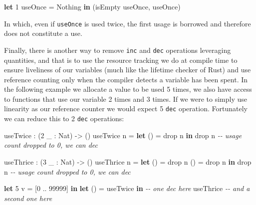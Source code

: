 \documentclass[
]{article}
\newenvironment{Shaded}{}{}
\newcommand{\CommentTok}[1]{\textcolor[rgb]{0.38,0.63,0.69}{\textit{#1}}}
\newcommand{\DataTypeTok}[1]{\textcolor[rgb]{0.56,0.13,0.00}{#1}}
\newcommand{\DecValTok}[1]{\textcolor[rgb]{0.25,0.63,0.44}{#1}}
\newcommand{\FunctionTok}[1]{\textcolor[rgb]{0.02,0.16,0.49}{#1}}
\newcommand{\KeywordTok}[1]{\textcolor[rgb]{0.00,0.44,0.13}{\textbf{#1}}}
\newcommand{\NormalTok}[1]{#1}
\newcommand{\OperatorTok}[1]{\textcolor[rgb]{0.40,0.40,0.40}{#1}}
\newcommand{\OtherTok}[1]{\textcolor[rgb]{0.00,0.44,0.13}{#1}}
\begin{document}
\begin{Shaded}
\begin{Highlighting}[]
\KeywordTok{let} \DecValTok{1}\NormalTok{ useOnce }\OtherTok{=} \DataTypeTok{Nothing} \KeywordTok{in}
\NormalTok{    (isEmpty useOnce, useOnce)}
\end{Highlighting}
\end{Shaded}

In which, even if \texttt{useOnce} is used twice, the first usage is
borrowed and therefore does not constitute a use.

Finally, there is another way to remove \texttt{inc} and \texttt{dec}
operations leveraging quantities, and that is to use the resource
tracking we do at compile time to ensure liveliness of our variables
(much like the lifetime checker of Rust) and use reference counting only
when the compiler detects a variable has been spent. In the following
example we allocate a value to be used 5 times, we also have access to
functions that use our variable 2 times and 3 times. If we were to
simply use linearity as our reference counter we would expect 5
\texttt{dec} operation. Fortunately we can reduce this to 2 \texttt{dec}
operations:

\begin{Shaded}
\begin{Highlighting}[]
\NormalTok{useTwice }\OperatorTok{:}\NormalTok{ (}\DecValTok{2}\NormalTok{ \_ }\OperatorTok{:} \DataTypeTok{Nat}\NormalTok{) }\OtherTok{{-}\textgreater{}}\NormalTok{ ()}
\NormalTok{useTwice n }\OtherTok{=} \KeywordTok{let}\NormalTok{ () }\OtherTok{=} \FunctionTok{drop}\NormalTok{ n }\KeywordTok{in}
                 \FunctionTok{drop}\NormalTok{ n }\CommentTok{{-}{-} usage count dropped to 0, we can \textasciigrave{}dec\textasciigrave{}}

\NormalTok{useThrice }\OperatorTok{:}\NormalTok{ (}\DecValTok{3}\NormalTok{ \_ }\OperatorTok{:} \DataTypeTok{Nat}\NormalTok{) }\OtherTok{{-}\textgreater{}}\NormalTok{ ()}
\NormalTok{useThrice n }\OtherTok{=} \KeywordTok{let}\NormalTok{ () }\OtherTok{=} \FunctionTok{drop}\NormalTok{ n }
\NormalTok{                  () }\OtherTok{=} \FunctionTok{drop}\NormalTok{ n}
               \KeywordTok{in} \FunctionTok{drop}\NormalTok{ n }\CommentTok{{-}{-} usage count dropped to 0, we can \textasciigrave{}dec\textasciigrave{}}

\KeywordTok{let} \DecValTok{5}\NormalTok{ v }\OtherTok{=}\NormalTok{ [}\DecValTok{0} \OperatorTok{..} \DecValTok{99999}\NormalTok{] }\KeywordTok{in}
\KeywordTok{let}\NormalTok{ () }\OtherTok{=}\NormalTok{ useTwice }\KeywordTok{in} \CommentTok{{-}{-} one \textasciigrave{}dec\textasciigrave{} here}
\NormalTok{    useThrice }\CommentTok{{-}{-} and a second one here}
\end{Highlighting}
\end{Shaded}
\end{document}
